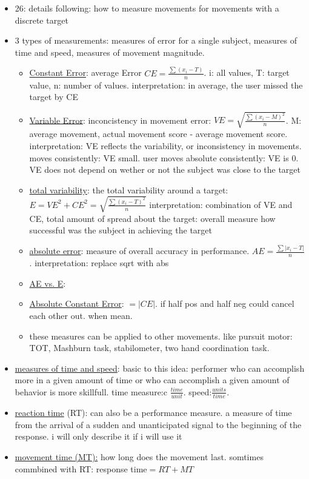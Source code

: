 	\begin{itemize}
		\item 26: details following: how to measure movements for movements with a discrete target
		\item 3 types of measurements: measures of error for a single subject, measures of time and speed, measures of movement magnitude.
		\begin{itemize}
		\item \underline{Constant Error}: average Error $CE=\frac{\sum(x_i-T)}{n}$. i: all values, T: target value, n: number of values. interpretation: in average, the user missed the target by CE
		\item \underline{Variable Error}: inconcistency in movement error: $VE=\sqrt{\frac{\sum(x_i-M)^2}{n}}$. M: average movement, actual movement score - average movement score. interpretation: VE reflects the variability, or inconsistency in movements. moves consistently: VE small. user moves absolute consistently: VE is 0. VE does not depend on wether or not the subject was close to the target
		\item \underline{total variability}: the total variability around a target: $E=VE^2+CE^2=\sqrt{\frac{\sum(x_i-T)^2}{n}}$
		interpretation: combination of VE and CE, total amount of spread about the target: overall measure how successful was the subject in achieving the target
		\item \underline{absolute error}: measure of overall accuracy in performance. $AE=\frac{\sum|x_i-T|}{n}$. interpretation: replace sqrt with abs
		\item \underline{AE vs. E}: \todo
		\item \underline{Absolute Constant Error}: $=|CE|$. if half pos and half neg could cancel each other out. when mean.
		\item these measures can be applied to other movements. like pursuit motor: TOT, Mashburn task, stabilometer, two hand coordination task.
	\end{itemize}
		
		\item \underline{measures of time and speed}: basic to this idea: performer who can accomplish more in a given amount of time or who can accomplish a given amount of behavior is  more skillfull. time measure:c $\frac{time}{unit}$. speed:$\frac{units}{time}$.
		\item \underline{reaction time} (RT): can also be a performance measure. a measure of time from the arrival of a sudden and unanticipated signal to the beginning of the response. 
		i will only describe it if i will use it
		\item \underline{movement time (MT):} how long does the movement last. somtimes commbined with RT: response time$=RT+MT$
		
	\end{itemize}
